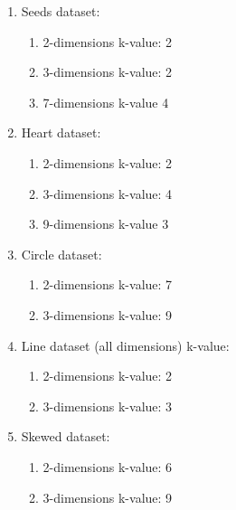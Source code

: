 \begin{enumerate}
    \item Seeds dataset:
    \begin{enumerate}
        \item 2-dimensions k-value: 2
        \item 3-dimensions k-value: 2
        \item 7-dimensions k-value 4
    \end{enumerate}
    \item     Heart dataset:
    \begin{enumerate}
        \item 2-dimensions k-value: 2
        \item 3-dimensions k-value: 4
        \item 9-dimensions k-value 3
    \end{enumerate}
    \item Circle dataset:
    \begin{enumerate}
        \item 2-dimensions k-value: 7
        \item 3-dimensions k-value: 9
    \end{enumerate}
    \item Line dataset (all dimensions) k-value: 
    \begin{enumerate}
        \item 2-dimensions k-value: 2
        \item 3-dimensions k-value: 3
    \end{enumerate}
    \item Skewed dataset:
    \begin{enumerate}
        \item 2-dimensions k-value: 6
        \item 3-dimensions k-value: 9
    \end{enumerate}
\end{enumerate}
\newpage
